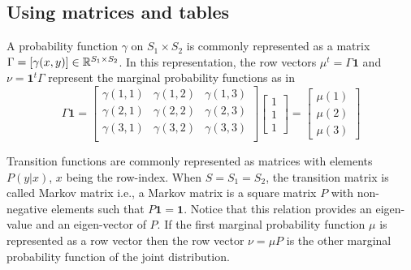 \documentclass[12pt,a4paper]{amsart}
\newcommand{\one}{\bm 1}
\theoremstyle{plain}%
\theoremstyle{definition}
\theoremstyle{remark}
\begin{document}
\subsection{Using matrices and tables}
\label{sec:using-matr-tabl}
A probability function $\gamma$ on $S_1 \times S_2$ is commonly represented as a matrix $\Gamma = [\gamma(x,y)] \in \mathbb{R}^{S_1 \times S_2}$. In this representation, the row vectors $\mu^t = \Gamma \one$ and $\nu = \one^t \Gamma$ represent the marginal probability functions as in
\begin{equation*}
  \Gamma \one =
  \begin{bmatrix}
    \gamma(1,1)  & \gamma(1,2) & \gamma(1,3) \\
    \gamma(2,1)  & \gamma(2,2) & \gamma(2,3) \\
    \gamma(3,1)  & \gamma(3,2) & \gamma(3,3) \\
  \end{bmatrix}
  \begin{bmatrix}
    1 \\ 1 \\ 1
  \end{bmatrix} =
  \begin{bmatrix}
    \mu(1) \\
    \mu(2) \\
    \mu(3) 
  \end{bmatrix}
\end{equation*}


Transition functions are commonly represented as matrices with elements $P(y|x)$, $x$ being the row-index. When $S=S_1=S_2$, the transition matrix is called Markov matrix i.e., a Markov matrix is a square matrix $P$ with non-negative elements such that $P \one = \one$. Notice that this relation provides an eigen-value and an eigen-vector of $P$. If the first marginal probability function $\mu$ is represented as a row vector then the row vector $\nu = \mu P$ is the other marginal probability function of the joint distribution.
\end{document}
